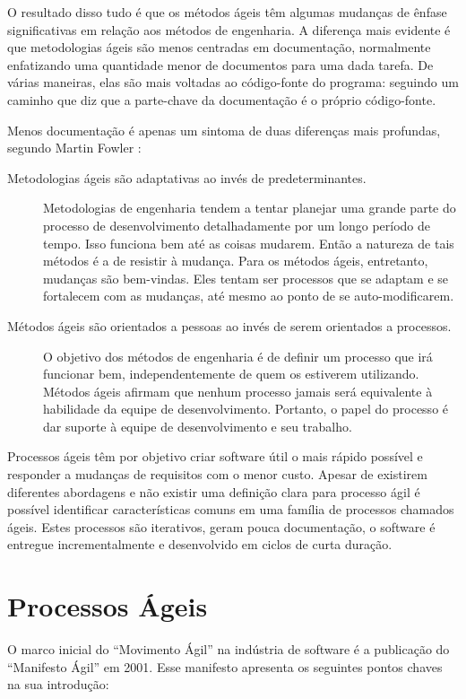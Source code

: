 O resultado disso tudo é que os métodos ágeis têm algumas mudanças de ênfase significativas em relação aos métodos de engenharia. A diferença mais evidente é que metodologias ágeis são menos centradas em documentação, normalmente enfatizando uma quantidade menor de documentos para uma dada tarefa. De várias maneiras, elas são mais voltadas ao código-fonte do programa: seguindo um caminho que diz que a parte-chave da documentação é o próprio código-fonte.

Menos documentação é apenas um sintoma de duas diferenças mais profundas, segundo Martin Fowler \cite{MartinFowler2005}:

\begin{description}
\item[Metodologias ágeis são adaptativas ao invés de predeterminantes.] Metodologias de engenharia tendem a tentar planejar uma grande parte do processo de desenvolvimento detalhadamente por um longo período de tempo. Isso funciona bem até as coisas mudarem. Então a natureza de tais métodos é a de resistir à mudança. Para os métodos ágeis, entretanto, mudanças são bem-vindas. Eles tentam ser processos que se adaptam e se fortalecem com as mudanças, até mesmo ao ponto de se auto-modificarem.

\item[Métodos ágeis são orientados a pessoas ao invés de serem orientados a processos.] O objetivo dos métodos de engenharia é de definir um processo que irá funcionar bem, independentemente de quem os estiverem utilizando. Métodos ágeis afirmam que nenhum processo jamais será equivalente à habilidade da equipe de desenvolvimento. Portanto, o papel do processo é dar suporte à equipe de desenvolvimento e seu trabalho.
\end{description}

Processos ágeis têm por objetivo criar software útil o mais rápido possível e responder a mudanças de requisitos com o menor custo. Apesar de existirem diferentes abordagens e não existir uma definição clara para processo ágil é possível identificar características comuns em uma família de processos chamados ágeis. Estes processos são iterativos, geram pouca documentação, o software é entregue incrementalmente e desenvolvido em ciclos de curta duração.

\section{Processos Ágeis}

	O marco inicial do “Movimento Ágil” na indústria de software é a publicação do “Manifesto Ágil” em 2001\cite{agilemanifesto2001}. Esse manifesto apresenta os seguintes pontos chaves na sua introdução:

